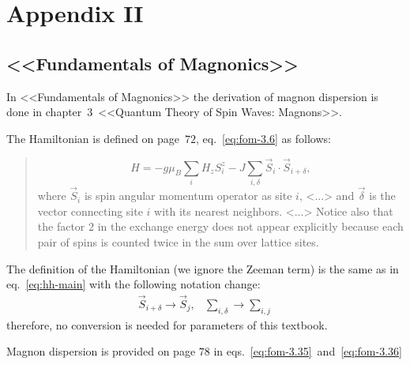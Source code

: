 \section{Appendix II}

\subsection{<<Fundamentals of Magnonics>>\cite{rezende2020fundamentals}}

    In <<Fundamentals of Magnonics>> the derivation of magnon dispersion is done in chapter~$3$~<<Quantum Theory of Spin Waves: Magnons>>.

    The Hamiltonian is defined on page~$72$, eq.~\eqref{eq:fom-3.6} as follows:

    \begin{quote}
        \begin{equation}
            H = -g\mu_B\sum_iH_zS_i^z - J\sum_{i, \delta}\vec{S}_i \cdot \vec{S}_{i+\delta}, \label{eq:fom-3.6} \tag{3.6}
        \end{equation}
        where $\vec{S}_i$ is spin angular momentum operator as site $i$, <...> and $\vec{\delta}$ is the vector connecting site $i$ with its nearest neighbors. 
        <...> Notice also that the factor 2 in the exchange energy does not appear explicitly because each pair of spins is counted twice in the sum over lattice sites.
    \end{quote}

    The definition of the Hamiltonian (we ignore the Zeeman term) is the same as in eq.~\eqref{eq:hh-main} with the following notation change:
    \begin{equation}
        \begin{matrix} 
            \vec{S}_{i+\delta} \rightarrow \vec{S}_j, & \sum_{i, \delta} \rightarrow \sum_{i,j}
        \end{matrix}
    \end{equation}
    therefore, no conversion is needed for parameters of this textbook.

    Magnon dispersion is provided on page $78$ in eqs.~\eqref{eq:fom-3.35}~and~\eqref{eq:fom-3.36}

